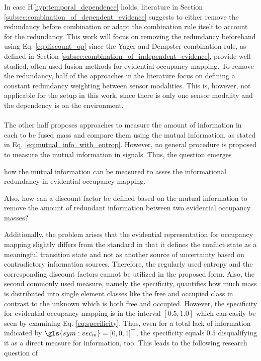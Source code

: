 In case H\ref{hyp:temporal_dependence} holds, literature in Section \ref{subsec:combination_of_dependent_evidence} suggests to either remove the redundancy before combination or adapt the combination rule itself to account for the redundancy. This work will focus on removing the redundancy beforehand using Eq. \ref{eq:discount_op} since the Yager and Dempster combination rule, as defined in Section \ref{subsec:combination_of_independent_evidence}, provide well studied, often used fusion methods for evidential occupancy mapping. To remove the redundancy, half of the approaches in the literature focus on defining a constant redundancy weighting between sensor modalities. This is, however, not applicable for the setup in this work, since there is only one sensor modality and the dependency is on the environment.
\\\\
The other half proposes approaches to measure the amount of information in each to be fused mass and compare them using the mutual information, as stated in Eq. \ref{eq:mutual_info_with_entrop}. However, no general procedure is proposed to measure the mutual information in signals. Thus, the question emerges
\\
\begin{requ} \label{requ:how_to_meas_redund}
	how the mutual information can be measured to asses the informational redundancy in evidential occupancy mapping.
\end{requ}
\vspace{\baselineskip}
\begin{requ} \label{requ:how_to_define_discount_fact}
	Also, how can a discount factor be defined based on the mutual information to remove the amount of redundant information between two evidential occupancy masses?
\end{requ}
Additionally, the problem arises that the evidential representation for occupancy mapping slightly differs from the standard in that it defines the conflict state as a meaningful transition state and not as another source of uncertainty based on contradictory information sources. Therefore, the regularly used entropy and the corresponding discount factors cannot be utilized in the proposed form. Also, the second commonly used measure, namely the specificity, quantifies how much mass is distributed into single element classes like the free and occupied class in contrast to the unknown which is both free and occupied. However, the specificity for evidential occupancy mapping is in the interval $[0.5,1.0]$ which can easily be seen by examining Eq. \ref{eq:specificity}. Thus, even for a total lack of information indicated by $\gls{sym:vec_m} = [0,0,1]^\top$, the specificity equals $0.5$ disqualifying it as a direct measure for information, too. This leads to the following research question of
